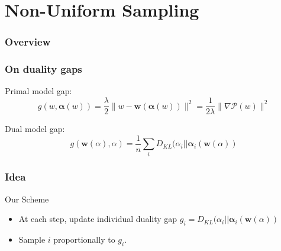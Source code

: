 \documentclass{beamer}
\DeclareMathOperator{\1}{\mathbb{1}}
\begin{document}
\section{Non-Uniform Sampling}
\begin{frame}
	\frametitle{Overview}
	\tableofcontents[currentsection] 
\end{frame}
\begin{frame}
	\frametitle{On duality gaps}
	
	Primal model gap:
	\begin{equation*}
		\label{primal duality gap}
		g(w,\bm \alpha(w)) = \frac{\lambda}{2} \|w- \bm w(\bm \alpha(w))\|^2 = \frac{1}{2 \lambda} \|\nabla \mathscr P(w)\|^2
	\end{equation*}
	
	Dual model gap:
	\begin{equation*}
		g(\bm w(\alpha),\alpha) = \frac{1}{n} \sum_i D_{KL} (\alpha_i || \bm \alpha_i(\bm w(\alpha))
	\end{equation*}
	
\end{frame}
\begin{frame}
	\frametitle{Idea}
	
	\begin{block}{Our Scheme}
	\begin{itemize}
		\item At each step, update individual duality gap $ g_i = D_{KL} (\alpha_i || \bm \alpha_i(\bm w(\alpha))$
		\item Sample $i$ proportionally to $g_i$.
	\end{itemize}
	\end{block}
	
	
\end{frame}
\end{document}
